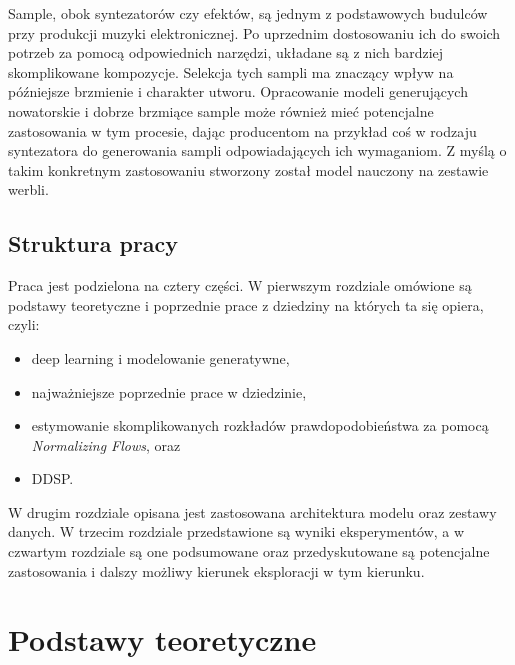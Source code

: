 \documentclass[magisterska]{pracamgr}
\begin{document}
Sample, obok syntezatorów czy efektów, są jednym z podstawowych budulców przy produkcji muzyki elektronicznej. Po uprzednim dostosowaniu ich do swoich potrzeb za pomocą odpowiednich narzędzi, układane są z nich bardziej skomplikowane kompozycje. Selekcja tych sampli ma znaczący wpływ na późniejsze brzmienie i charakter utworu. Opracowanie modeli generujących nowatorskie i dobrze brzmiące sample może również mieć potencjalne zastosowania w tym procesie, dając producentom na przykład coś w rodzaju syntezatora do generowania sampli odpowiadających ich wymaganiom. Z myślą o takim konkretnym zastosowaniu stworzony został model nauczony na zestawie werbli.

\section*{Struktura pracy}

Praca jest podzielona na cztery części. W pierwszym rozdziale omówione są podstawy teoretyczne i poprzednie prace z dziedziny na których ta się opiera, czyli:
\begin{itemize}
    \setlength\itemsep{0em}
    \item deep learning i modelowanie generatywne,
    \item najważniejsze poprzednie prace w dziedzinie,
    \item estymowanie skomplikowanych rozkładów prawdopodobieństwa za pomocą \textit{Normalizing Flows}, oraz
    \item DDSP.
\end{itemize}
W drugim rozdziale opisana jest zastosowana architektura modelu oraz zestawy danych. W trzecim rozdziale przedstawione są wyniki eksperymentów, a w czwartym rozdziale są one podsumowane oraz przedyskutowane są potencjalne zastosowania i dalszy możliwy kierunek eksploracji w tym kierunku.

\chapter{Podstawy teoretyczne}

\end{document}
